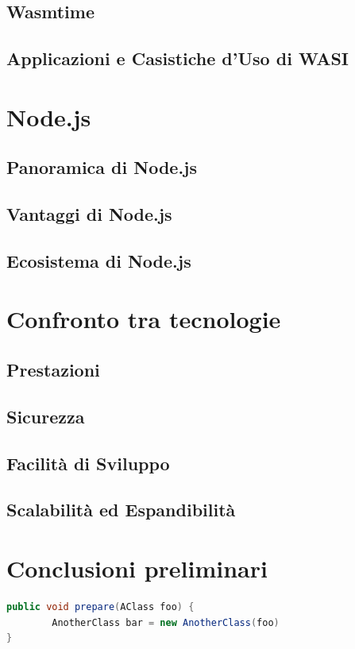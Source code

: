 \subsection{Wasmtime}
\subsection{Applicazioni e Casistiche d'Uso di WASI}

\newpage
\section{Node.js}
\label{sec:Node}
\subsection{Panoramica di Node.js}
\subsection{Vantaggi di Node.js}
\subsection{Ecosistema di Node.js}

\newpage
\section{Confronto tra tecnologie}
\label{sec:Confronto}
\subsection{Prestazioni}
\subsection{Sicurezza}
\subsection{Facilità di Sviluppo}
\subsection{Scalabilità ed Espandibilità}

\newpage
\section{Conclusioni preliminari}
\label{sec:ConclusioniTecnologie}

\newpage


\begin{lstlisting}[language=Java, label=lst:java, caption={Some code in another language than the default one}]
public void prepare(AClass foo) {
        AnotherClass bar = new AnotherClass(foo)
}
\end{lstlisting}
